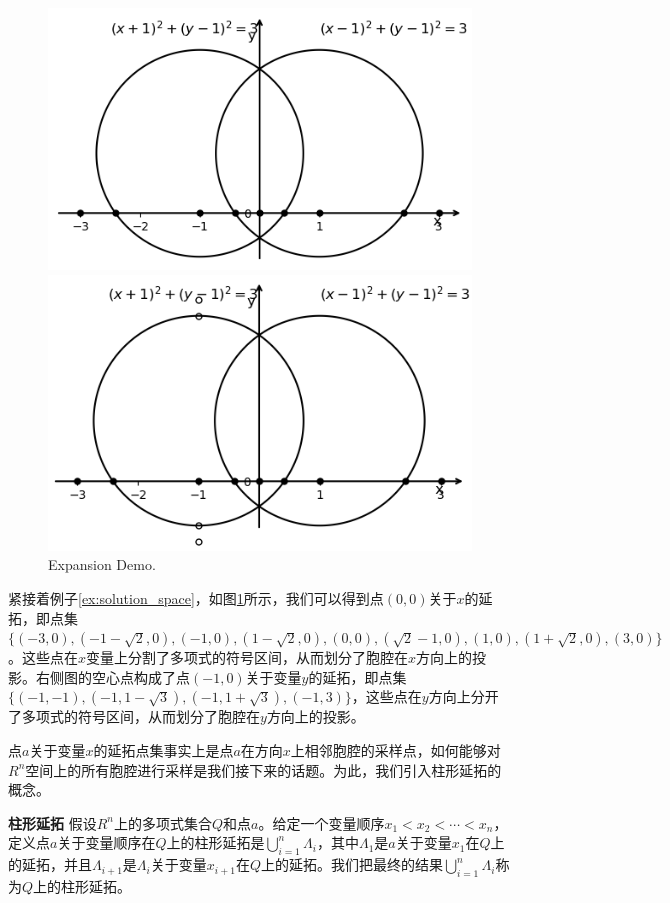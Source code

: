 \begin{example}
\begin{figure}[]
    \centering
    \includegraphics[width=0.45\columnwidth]{Img/cell2.png} \qquad
    \includegraphics[width=0.45\columnwidth]{Img/cell3.png}
     {Expansion Demo.}
    \label{fig:expansion}
\end{figure}
紧接着例子\ref{ex:solution_space}，如图\ref{fig:expansion}所示，我们可以得到点$(0, 0)$关于$x$的延拓，即点集$\{(-3, 0), (-1-\sqrt{2}, 0), (-1, 0), (1-\sqrt{2}, 0), (0, 0), (\sqrt{2} - 1, 0), (1, 0), (1+\sqrt{2}, 0), (3, 0)\}$。这些点在$x$变量上分割了多项式的符号区间，从而划分了胞腔在$x$方向上的投影。右侧图的空心点构成了点$(-1, 0)$关于变量$y$的延拓，即点集$\{(-1, -1), (-1, 1-\sqrt{3}), (-1, 1+\sqrt{3}), (-1, 3)\}$，这些点在$y$方向上分开了多项式的符号区间，从而划分了胞腔在$y$方向上的投影。
\label{ex:expansion}
\end{example}
点$a$关于变量$x$的延拓点集事实上是点$a$在方向$x$上相邻胞腔的采样点，如何能够对$R^n$空间上的所有胞腔进行采样是我们接下来的话题。为此，我们引入柱形延拓的概念。

\begin{definition}{\textbf{柱形延拓}}
假设$R^n$上的多项式集合$Q$和点$a$。给定一个变量顺序$x_1 < x_2 < \cdots < x_n$，定义点$a$关于变量顺序在$Q$上的柱形延拓是$\bigcup_{i=1}^n \Lambda_i$，其中$\Lambda_1$是$a$关于变量$x_1$在$Q$上的延拓，并且$\Lambda_{i+1}$是$\Lambda_i$关于变量$x_{i+1}$在$Q$上的延拓。我们把最终的结果$\bigcup_{i=1}^n \Lambda_i$称为$Q$上的柱形延拓。
\end{definition}

